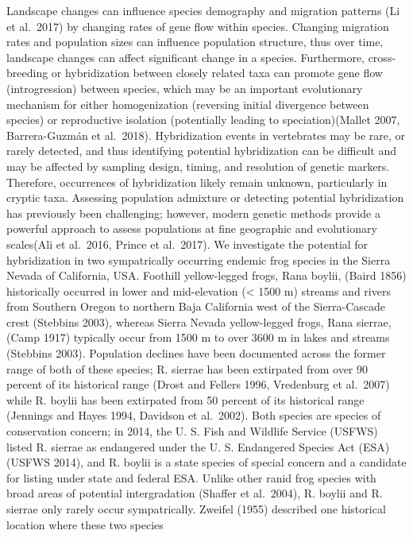 \documentclass[twoside,12pt,final]{ucthesis-CA2012}
\begin{document}
\begin{ucmainmatter}
Landscape changes can influence species demography and migration
patterns (Li et al.~2017) by changing rates of gene flow within species.
Changing migration rates and population sizes can influence population
structure, thus over time, landscape changes can affect significant
change in a species. Furthermore, cross-breeding or hybridization
between closely related taxa can promote gene flow (introgression)
between species, which may be an important evolutionary mechanism for
either homogenization (reversing initial divergence between species) or
reproductive isolation (potentially leading to speciation)(Mallet 2007,
Barrera-Guzmán et al.~2018). Hybridization events in vertebrates may be
rare, or rarely detected, and thus identifying potential hybridization
can be difficult and may be affected by sampling design, timing, and
resolution of genetic markers. Therefore, occurrences of hybridization
likely remain unknown, particularly in cryptic taxa. Assessing
population admixture or detecting potential hybridization has previously
been challenging; however, modern genetic methods provide a powerful
approach to assess populations at fine geographic and evolutionary
scales(Ali et al.~2016, Prince et al.~2017). We investigate the
potential for hybridization in two sympatrically occurring endemic frog
species in the Sierra Nevada of California, USA. Foothill yellow-legged
frogs, Rana boylii, (Baird 1856) historically occurred in lower and
mid-elevation (\textless{} 1500 m) streams and rivers from Southern
Oregon to northern Baja California west of the Sierra-Cascade crest
(Stebbins 2003), whereas Sierra Nevada yellow-legged frogs, Rana
sierrae, (Camp 1917) typically occur from 1500 m to over 3600 m in lakes
and streams (Stebbins 2003). Population declines have been documented
across the former range of both of these species; R. sierrae has been
extirpated from over 90 percent of its historical range (Drost and
Fellers 1996, Vredenburg et al.~2007) while R. boylii has been
extirpated from 50 percent of its historical range (Jennings and Hayes
1994, Davidson et al.~2002). Both species are species of conservation
concern; in 2014, the U. S. Fish and Wildlife Service (USFWS) listed R.
sierrae as endangered under the U. S. Endangered Species Act (ESA)(USFWS
2014), and R. boylii is a state species of special concern and a
candidate for listing under state and federal ESA. Unlike other ranid
frog species with broad areas of potential intergradation (Shaffer et
al.~2004), R. boylii and R. sierrae only rarely occur sympatrically.
Zweifel (1955) described one historical location where these two species

\end{ucmainmatter}
\end{document}
